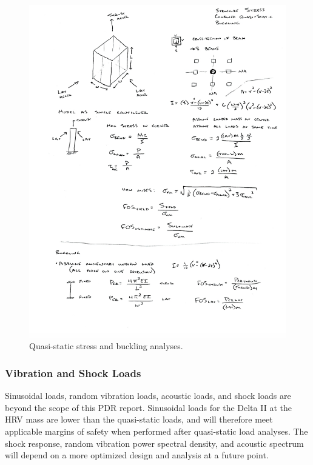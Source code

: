 \documentclass[paper=letter, fontsize=11pt]{scrartcl} %
\numberwithin{equation}{section} %
\numberwithin{figure}{section} %
\numberwithin{table}{section} %
\begin{document}
\begin{figure}[H]
    \begin{center}
    \includegraphics[width=1\textwidth]{Pics/stressbuckl.png}
    \caption{Quasi-static stress and buckling analyses.}
    \label{fig:p8}
    \end{center}
\end{figure}

\subsubsection{Vibration and Shock Loads}
Sinusoidal loads, random vibration loads, acoustic loads, and shock loads are beyond the scope of this PDR report. Sinusoidal loads for the Delta II at the HRV mass are lower than the quasi-static loads, and will therefore meet applicable margins of safety when performed after quasi-static load analyses. The shock response, random vibration power spectral density, and acoustic spectrum will depend on a more optimized design and analysis at a future point.
\end{document}

